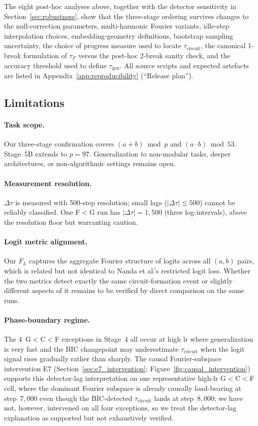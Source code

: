 \documentclass{article}
\newcommand{\taug}{\tau_{\mathrm{gen}}}
\newcommand{\tauf}{\tau_{F}}
\newcommand{\taucirc}{\tau_{\mathrm{circuit}}}
\newcommand{\Dtau}{\Delta\tau}
\newcommand{\flogit}{F_{L}}
\begin{document}
The eight post-hoc analyses above, together with the detector
sensitivity in Section~\ref{sec:robustness}, show that the
three-stage ordering survives changes to the null-correction
parameters, multi-harmonic Fourier variants, idle-step
interpolation choices, embedding-geometry definitions,
bootstrap sampling uncertainty, the choice of progress measure
used to locate $\taucirc$, the canonical 1-break formulation of
$\tauf$ versus the post-hoc 2-break sanity check, and the
accuracy threshold used to define $\taug$.
All source scripts and expected artefacts are listed in
Appendix~\ref{app:reproducibility} (``Release plan'').

\subsection{Limitations}
\label{sec:limitations}

\paragraph{Task scope.}
Our three-stage confirmation covers $(a+b)\bmod p$ and $(a\cdot b)\bmod 53$.
Stage~5B extends to $p{=}97$.
Generalization to non-modular tasks, deeper architectures, or
non-algorithmic settings remains open.

\paragraph{Measurement resolution.}
$\Dtau$ is measured with 500-step resolution;
small lags ($|\Dtau|\lesssim500$) cannot be reliably classified.
One F$<$G run has $|\Dtau|=1{,}500$ (three log-intervals),
above the resolution floor but warranting caution.

\paragraph{Logit metric alignment.}
Our $\flogit$ captures the aggregate Fourier structure of logits
across all $(a,b)$ pairs, which is related but not identical to
Nanda et al.'s restricted logit loss.
Whether the two metrics detect exactly the same circuit-formation
event or slightly different aspects of it remains to be verified
by direct comparison on the same runs.

\paragraph{Phase-boundary regime.}
The 4~G$<$C$<$F exceptions in Stage~4 all occur at high lr
where generalization is very fast and the BIC changepoint may
underestimate $\taucirc$ when the logit signal rises gradually
rather than sharply.
The causal Fourier-subspace intervention E7
(Section~\ref{sec:e7_intervention};
Figure~\ref{fig:causal_intervention})
supports this detector-lag interpretation on one representative
high-lr G$<$C$<$F cell, where the dominant Fourier subspace is
already causally load-bearing at step~$7{,}000$ even though the
BIC-detected $\taucirc$ lands at step~$8{,}000$;
we have not, however, intervened on all four exceptions, so we
treat the detector-lag explanation as supported but not
exhaustively verified.
\end{document}
